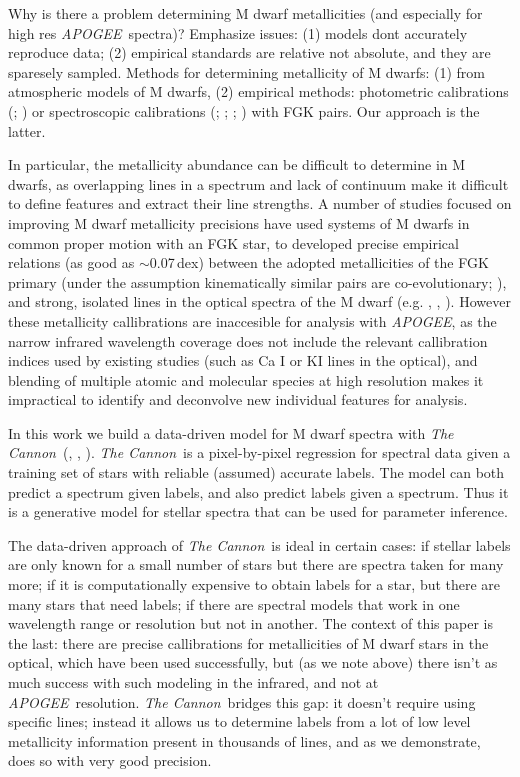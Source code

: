 \documentclass[modern]{aastex62}
\newcommand{\apogee}{\textsl{APOGEE}}
\newcommand{\thecannon}{\textsl{The Cannon}}
\begin{document}
Why is there a problem determining M dwarf metallicities (and especially for high res \apogee\ spectra)? Emphasize issues: (1) models dont accurately reproduce data; (2) empirical standards are relative not absolute, and they are sparesely sampled. 
Methods for determining metallicity of M dwarfs: (1) from atmospheric models of M dwarfs, (2) empirical methods: photometric calibrations (\citealt{Johnson:2009}; \citealt{Schlaufman:2010}) or spectroscopic calibrations (\citealt{Terrien:2012}; \citealt{Rojas-Ayala:2012}; \citealt{Mann:2013a}; \citealt{Newton:2014}) with FGK pairs. Our approach is the latter.

In particular, the metallicity abundance can be difficult to determine in M dwarfs, as overlapping lines in a spectrum and lack of continuum make it difficult to define features and extract their line strengths. A number of studies focused on improving M dwarf metallicity precisions have used systems of M dwarfs in common proper motion with an FGK star, to developed precise empirical relations (as good as $\sim$0.07\,dex) between the adopted metallicities of the FGK primary (under the assumption kinematically similar pairs are co-evolutionary; \citealt{Bonfils:2005}), and strong, isolated lines in the optical spectra of the M dwarf (e.g. \citealt{Terrien:2012}, \citealt{Rojas-Ayala:2012}, \citealt{Newton:2014}).
However these metallicity callibrations are inaccesible for analysis with \apogee, as the narrow infrared wavelength coverage does not include the relevant callibration indices used by existing studies (such as Ca I or KI lines in the optical), and blending of multiple atomic and molecular species at high resolution makes it impractical to identify and deconvolve new individual features for analysis. 

In this work we build a data-driven model for M dwarf spectra with \thecannon\ (\citealt{Ness:2015}, \citealt{Ho:2017a}, \citealt{Casey:2016}).
\thecannon\ is a pixel-by-pixel regression for spectral data given a training
set of stars with reliable (assumed) accurate labels.
The model can both predict a spectrum given labels, and also predict labels given a spectrum.
Thus it is a generative model for stellar spectra that can be used for parameter inference.

The data-driven approach of \thecannon\ is ideal in certain cases:
if stellar labels are only known for a small number of stars
but there are spectra taken for many more;
if it is computationally expensive to obtain labels for a star, but
there are many stars that need labels;
if there are spectral models that work in one wavelength range or resolution but not in another.
The context of this paper is the last:
there are precise callibrations for metallicities of M dwarf stars in the optical, which have been
used successfully, but (as we note above) there isn't as much success with such modeling in the infrared, and not at \apogee\ resolution.
\thecannon\ bridges this gap: it doesn't require using specific lines; instead it allows us to determine labels from a lot of low level metallicity information present in thousands of lines, and as we demonstrate, does so with very good precision.
\end{document}
